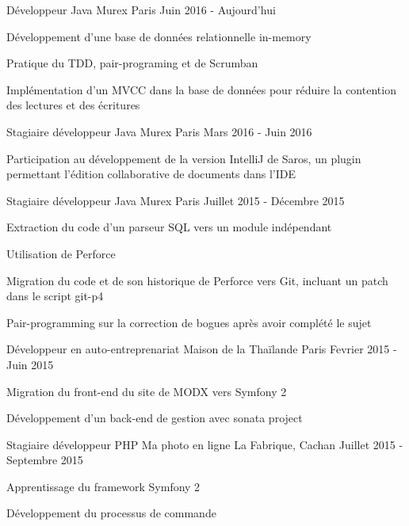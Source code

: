 
\begin{cventries}

\cventry
{Développeur Java}
{Murex}
{Paris}
{Juin 2016 - Aujourd'hui}
{
	\begin{cvitems}
	\item{Développement d'une base de données relationnelle in-memory}
	\item{Pratique du TDD, pair-programing et de Scrumban}
	\item{Implémentation d'un MVCC dans la base de données pour réduire la contention des lectures et des écritures}
	\end{cvitems}
}

\cventry
{Stagiaire développeur Java}
{Murex}
{Paris}
{Mars 2016 - Juin 2016}
{
	\begin{cvitems}
	\item{Participation au développement de la version IntelliJ de Saros, un plugin permettant l'édition collaborative de documents dans l'IDE}
	\end{cvitems}
}

\cventry
{Stagiaire développeur Java}
{Murex}
{Paris}
{Juillet 2015 - Décembre 2015}
{
	\begin{cvitems}
	\item{Extraction du code d'un parseur SQL vers un module indépendant}
	\item{Utilisation de Perforce}
	\item{Migration du code et de son historique de Perforce vers Git, incluant un patch dans le script git-p4}
	\item{Pair-programming sur la correction de bogues après avoir complété le sujet}
	\end{cvitems}
}

\cventry
{Développeur en auto-entreprenariat}
{Maison de la Thaïlande}
{Paris}
{Fevrier 2015 - Juin 2015}
{
	\begin{cvitems}
	\item{Migration du front-end du site de MODX vers Symfony 2}
	\item{Développement d'un back-end de gestion avec sonata project}
	\end{cvitems}
}

\cventry
{Stagiaire développeur PHP}
{Ma photo en ligne}
{La Fabrique, Cachan}
{Juillet 2015 - Septembre 2015}
{
	\begin{cvitems}
	\item{Apprentissage du framework Symfony 2}
	\item{Développement du processus de commande}
	\end{cvitems}
}

\end{cventries}